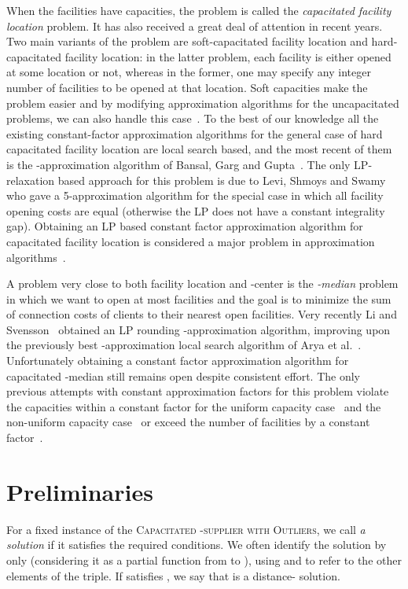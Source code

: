 \documentclass{article}
\newcommand{\fullsup}{\textsc{Capacitated} -\textsc{supplier with Outliers}}
\theoremstyle{plain}
\theoremstyle{definition}
\begin{document}
When the facilities have capacities, the problem is called the {\em capacitated
facility location} problem. It has also received a great deal of
attention in recent years. Two main variants of the problem are
soft-capacitated facility location and hard-capacitated facility
location: in the latter problem, each facility is either opened at
some location or not, whereas in the former, one may specify any
integer number of facilities to be opened at that location. Soft
capacities make the problem easier and by modifying approximation
algorithms for the uncapacitated problems, we can also handle this
case~\cite{STA,JV}.
To the best of our knowledge all the existing constant-factor approximation
algorithms for the general case of hard capacitated facility location
are local search based, and the most recent of them is the -approximation
algorithm of Bansal, Garg and Gupta~\cite{bgg12}.
The only LP-relaxation based approach for this problem is due to Levi, Shmoys
and Swamy~\cite{LSS04} who gave a 5-approximation algorithm for the
special case in which all facility opening costs are equal
(otherwise the LP does not have a constant integrality gap).
Obtaining an LP based constant factor approximation algorithm
for capacitated facility location is considered a major problem in
approximation algorithms~\cite{sw-book}.

A problem very close to both facility location and -center is the {\em -median} problem in which we want to open at most  facilities 
and the goal is to minimize the sum of connection costs of clients to their nearest open facilities.
Very recently Li and Svensson~\cite{li-svensson} obtained an LP rounding -approximation algorithm,
improving upon the previously best -approximation local search
algorithm of Arya et al.~\cite{kmed3}.
Unfortunately obtaining a constant factor approximation algorithm for capacitated -median still remains open despite consistent effort. 
The only previous attempts with  constant approximation factors for this problem violate the capacities within a constant 
factor for the uniform capacity case~\cite{CGTS} and the non-uniform capacity case~\cite{CR05} or exceed the number  of facilities by a constant factor~\cite{BCR01}. 

\section{Preliminaries}

For a fixed instance of the \fullsup, we call 
\emph{a solution} if it satisfies the required conditions. We often identify the
solution by  only (considering it as a partial function from  to ),
using  and  to refer to the other elements of the triple.
If  satisfies , we say that  is
a distance- solution.
\end{document}
